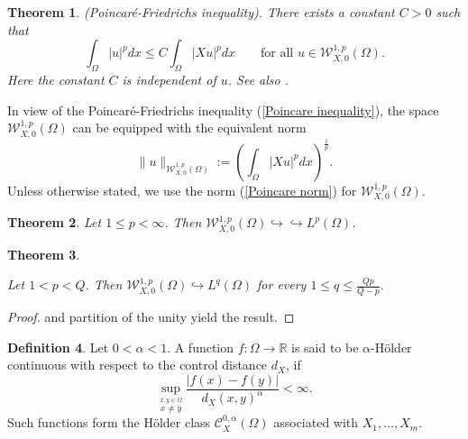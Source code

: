 \documentclass[a4paper,12pt,reqno]{amsart}
\renewcommand\eqref[1]{(\ref{#1})} %
\numberwithin{equation}{section}
\theoremstyle{plain}
\newtheorem{theorem}{Theorem}[section]
\theoremstyle{definition}
\newtheorem{definition}[theorem]{Definition}
\begin{document}
\begin{theorem}\cite[Theorem 2.5]{capogna2024asymptotic}  (Poincar\'e-Friedrichs inequality). There exists a  constant $C>0$ such that 
\begin{equation}\label{Poincare inequality}
\int_{\Omega}|u|^{p} d x\leq C \int_{\Omega}|X u|^{p} d x \qquad \text{for all }u\in \mathcal{W}_{X,0}^{1, p}(\Omega).
\end{equation}
Here the constant $C$ is independent of $u$. See also \cite[Proposition 2.6]{chen2024sharp}.
\end{theorem}
In view of the Poincar\'e-Friedrichs inequality \eqref{Poincare inequality}, the space $\mathcal{W}_{X,0}^{1, p}(\Omega)$ can be equipped with the equivalent norm
\begin{equation}\label{Poincare norm}
\|u\|_{\mathcal{W}_{X,0}^{1, p}(\Omega)}:=\left(\int_{\Omega}\left|X u\right|^{p} d x\right)^{\frac{1}{p}}.
\end{equation}
Unless otherwise stated, we use the norm \eqref{Poincare norm} for $\mathcal{W}_{X,0}^{1, p}(\Omega)$. 

\begin{theorem}\label{compact Sobolev embedding}\cite[Corollary 3.3]{Danielli1991}
Let $1\leq p<\infty$. Then  $\mathcal{W}_{X,0}^{1, p}(\Omega)\hookrightarrow\hookrightarrow L^{p}(\Omega)$.
\end{theorem}

\begin{theorem}\label{continuous Sobolev embedding for 1<p<Q}

Let  $1< p <Q$. Then  $\mathcal{W}_{X,0}^{1, p}(\Omega)\hookrightarrow L^{q}(\Omega)$   for every $1\leq q \leq \frac{Qp}{Q-p}.$  
\end{theorem}
\begin{proof}
\cite[Theorem 2.3]{capogna1993embedding} and partition of the unity yield the result. 
\end{proof}
\begin{definition}
Let $0<\alpha<1$. A function $f:\Omega\to \mathbb{R}$ is said to be $\alpha$-H\"older continuous with respect to the control distance $d_{X}$, if
\begin{equation*}
\sup_{\stackrel{x,y\in \Omega}{x\neq y}}\frac{|f(x)-f(y)|}{d_{X}(x,y)^{\alpha}}<\infty.   
\end{equation*}
Such functions form the H\"older class $\mathcal{C}^{0,\alpha}_{X}(\Omega)$ associated with $X_{1}, \ldots, X_{m}$.
\end{definition}
\end{document}
